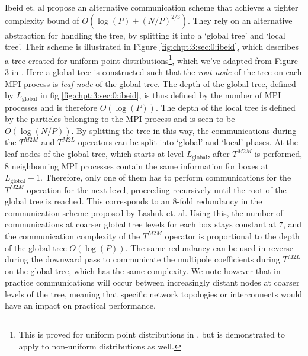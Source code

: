 Ibeid et. al \cite{Ibeid2016} propose an alternative communication scheme that achieves a tighter complexity bound of $O(\log(P) + (N/P)^{2/3})$. They rely on an alternative abstraction for handling the tree, by splitting it into a `global tree' and `local tree'. Their scheme is illustrated in Figure \ref{fig:chpt:3:sec:0:ibeid}, which describes a tree created for uniform point distributions\footnote{This is proved for uniform point distributions in \cite{Ibeid2016}, but is demonstrated to apply to non-uniform distributions as well.}, which we've adapted from Figure 3 in \cite{Ibeid2016}. Here a global tree is constructed such that the \textit{root node} of the tree on each MPI process is \textit{leaf node} of the global tree. The depth of the global tree, defined by $L_{\text{global}}$ in fig \ref{fig:chpt:3:sec:0:ibeid}, is thus defined by the number of MPI processes and is therefore $O(\log(P))$. The depth of the local tree is defined by the particles belonging to the MPI process and is seen to be $O(\log(N/P))$. By splitting the tree in this way, the communications during the $T^{M2M}$ and $T^{M2L}$ operators can be split into `global' and `local' phases. At the leaf nodes of the global tree, which starts at level $L_{\text{global}}$, after $T^{M2M}$ is performed, 8 neighbouring MPI processes contain the same information for boxes at $L_{\text{global}}-1$. Therefore, only one of them has to perform communications for the $T^{M2M}$ operation for the next level, proceeding recursively until the root of the global tree is reached. This corresponds to an 8-fold redundancy in the communication scheme proposed by Lashuk et. al. Using this, the number of communications at coarser global tree levels for each box stays constant at 7, and the communication complexity of the $T^{M2M}$ operator is proportional to the depth of the global tree $O(\log(P))$. The same redundancy can be used in reverse during the downward pass to communicate the multipole coefficients during $T^{M2L}$ on the global tree, which has the same complexity. We note however that in practice communications will occur between increasingly distant nodes at coarser levels of the tree, meaning that specific network topologies or interconnects would have an impact on practical performance.

